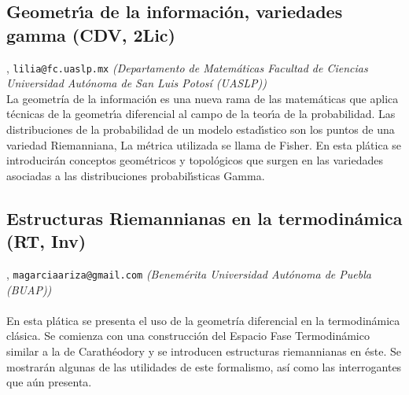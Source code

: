 \subsection{\sffamily Geometr\'\i a de la informaci\'on, variedades gamma {\footnotesize (CDV, 2Lic)}} \label{reg-1443} 
, {\tt lilia@fc.uaslp.mx}  {\slshape (Departamento de Matem\'aticas Facultad de Ciencias Universidad Aut\'onoma de San Luis Potos\'i (UASLP))}\\
          \noindent La geometr\'ia de la informaci\'on es una nueva rama de las matem\'aticas que aplica t\'ecnicas de la geometr\'\i a diferencial al campo de la teor\'\i a de la probabilidad. Las distribuciones de la probabilidad de un modelo estad\'\i stico son los puntos de una variedad Riemanniana, La m\'etrica utilizada se llama de Fisher. En esta pl\'atica se introducir\'an conceptos geom\'etricos y topol\'ogicos que surgen en las variedades asociadas a las distribuciones probabil\'\i sticas Gamma.
\subsection{\sffamily Estructuras Riemannianas en la termodin\'amica {\footnotesize (RT, Inv)}} \label{reg-1722} 
, {\tt magarciaariza@gmail.com}  {\slshape (Benem\'erita Universidad Aut\'onoma de Puebla (BUAP))}\\
\\
\noindent En esta pl\'atica se presenta el uso de la geometr\'ia diferencial en la termodin\'amica cl\'asica. Se comienza con una construcci\'on del Espacio Fase Termodin\'amico similar a la de Carath\'eodory y se introducen estructuras riemannianas en \'este. Se mostrar\'an algunas de las utilidades de este formalismo, as\'i como las interrogantes que a\'un presenta.
